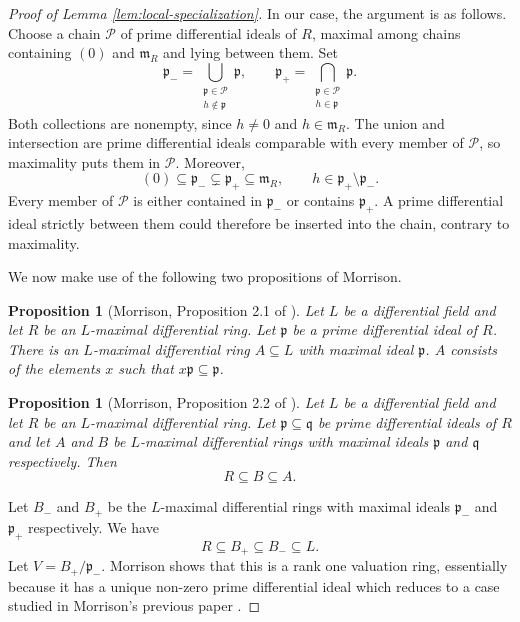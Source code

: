 \documentclass[12pt]{amsart}
\newtheorem{proposition}[theorem]{Proposition}
\theoremstyle{definition}
\numberwithin{subcase}{cases}
\theoremstyle{remark}
\begin{document}
\begin{proof}[Proof of Lemma \ref{lem:local-specialization}]
In our case, the argument is as follows. Choose a chain $\mathcal P$ of prime differential ideals of $R$,
maximal among chains containing $(0)$ and $\mathfrak m_R$ and lying
between them. Set
\[
 \mathfrak p_-=\bigcup_{\substack{\mathfrak p\in\mathcal P\\
                                  h\notin\mathfrak p}}\mathfrak p,
 \qquad
 \mathfrak p_+=\bigcap_{\substack{\mathfrak p\in\mathcal P\\
                                  h\in\mathfrak p}}\mathfrak p.
\]
Both collections are nonempty, since $h\ne0$ and
$h\in\mathfrak m_R$. The union and intersection are prime differential
ideals comparable with every member of $\mathcal P$, so maximality
puts them in $\mathcal P$. Moreover,
\begin{equation}\label{eq:adjacent-primes}
 (0)\subseteq\mathfrak p_-\subsetneq\mathfrak p_+
 \subseteq\mathfrak m_R,\qquad
 h\in\mathfrak p_+\setminus\mathfrak p_-.
\end{equation}
Every member of $\mathcal P$ is either contained in $\mathfrak p_-$
or contains $\mathfrak p_+$. A prime differential ideal strictly
between them could therefore be inserted into the chain, contrary
to maximality.

We now make use of the following two propositions of Morrison.

\begin{proposition}[Morrison, Proposition 2.1 of \cite{Morrison79}]
    Let $L$ be a differential field and let $R$ be an $L$-maximal differential ring. Let $\mathfrak{p}$ be a prime differential ideal of $R$. There is an $L$-maximal differential ring $A \subseteq L$ with maximal ideal $\mathfrak{p}$. $A$ consists of the elements $x$ such that $x \mathfrak{p} \subseteq \mathfrak{p}$.
\end{proposition}

\begin{proposition}[Morrison, Proposition 2.2 of \cite{Morrison79}]
    Let $L$ be a differential field and let $R$ be an $L$-maximal differential ring. Let $\mathfrak{p} \subseteq \mathfrak{q}$ be prime differential ideals of $R$ and let $A$ and $B$ be $L$-maximal differential rings with maximal ideals $\mathfrak{p}$ and $\mathfrak{q}$ respectively. Then
    \[ R \subseteq B \subseteq A.\]
\end{proposition}

Let $B_-$ and $B_+$ be the $L$-maximal differential rings with maximal ideals $\mathfrak p_-$ and $\mathfrak p_+$ respectively. We have
\[ R\subseteq B_+\subseteq B_-\subseteq L.\]
Let $V = B_+ / \mathfrak{p}_-$. Morrison shows that this is a rank one valuation ring, essentially because it has a unique non-zero prime differential ideal which reduces to a case studied in Morrison's previous paper \cite{Morrison78}.


\end{proof}
\end{document}

